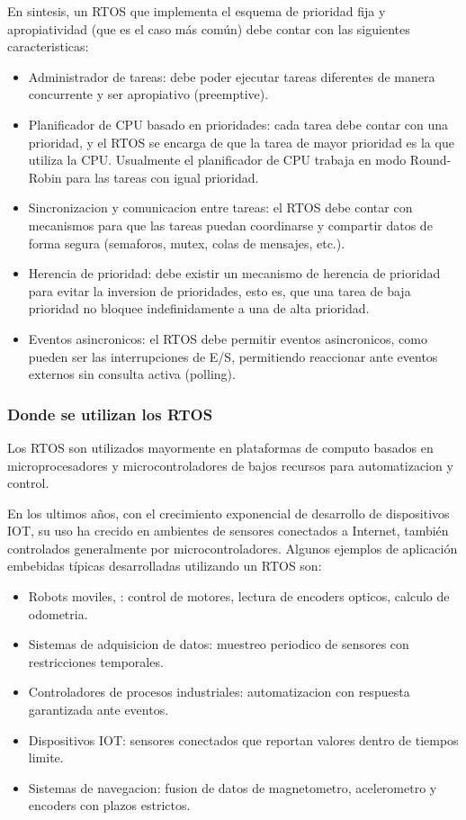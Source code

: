 \documentclass[output=paper, 
colorlinks,
citecolor=brown,
newtxmath
]{langscibook}
\begin{document}
En sintesis, un RTOS que implementa el esquema de prioridad fija y 
apropiatividad (que es el caso más común) debe contar con las siguientes 
caracteristicas:
\begin{itemize}
	\item Administrador de tareas: debe poder ejecutar tareas diferentes 
	de manera concurrente y ser apropiativo (preemptive).
\item Planificador de CPU basado en prioridades: cada tarea debe contar con una prioridad, y el RTOS se encarga de que la tarea de mayor prioridad es la que utiliza la CPU.
	Usualmente el planificador de CPU trabaja en modo Round-Robin para las tareas con igual prioridad.
\item Sincronizacion y comunicacion entre tareas: el RTOS debe contar con mecanismos para que las tareas puedan coordinarse y compartir datos de forma segura (semaforos, mutex, colas de mensajes, etc.).
\item Herencia de prioridad: debe existir un mecanismo de herencia de prioridad para evitar la inversion de prioridades, esto es, que una tarea de baja prioridad no bloquee indefinidamente a una de alta prioridad.
\item Eventos asincronicos: el RTOS debe permitir eventos asincronicos, como pueden ser las interrupciones de E/S, permitiendo reaccionar ante eventos externos sin consulta activa (polling).
\end{itemize}


\subsubsection{Donde se utilizan los RTOS}


Los RTOS son utilizados mayormente en plataformas de computo basados
en microprocesadores y microcontroladores de bajos 
recursos para automatizacion y control.

En los ultimos años, con el crecimiento exponencial de desarrollo de dispositivos IOT, su uso ha crecido en ambientes de sensores conectados a Internet, también controlados generalmente por microcontroladores. Algunos ejemplos de aplicación embebidas típicas desarrolladas utilizando un RTOS son: 
\begin{itemize}
	\item Robots moviles, : control de motores, lectura de encoders opticos, calculo de odometria.
	\item Sistemas de adquisicion de datos: muestreo periodico de sensores con restricciones temporales.
	\item Controladores de procesos industriales: automatizacion con respuesta garantizada ante eventos.
	\item Dispositivos IOT: sensores conectados que reportan valores dentro de tiempos limite.
	\item Sistemas de navegacion: fusion de datos de magnetometro, acelerometro y encoders con plazos estrictos.
\end{itemize}
\end{document}
